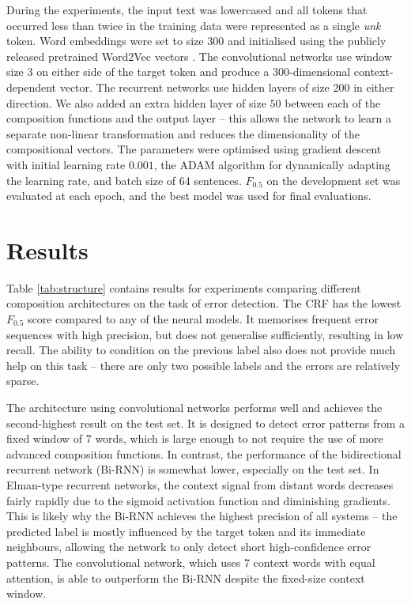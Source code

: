 \documentclass[11pt]{article}
\begin{document}
During the experiments, the input text was lowercased and all tokens that occurred less than twice in the training data were represented as a single \textit{unk} token.
Word embeddings were set to size $300$ and initialised using the publicly released pretrained Word2Vec vectors \cite{Mikolov2013a}.
The convolutional networks use window size $3$ on either side of the target token and produce a 300-dimensional context-dependent vector.
The recurrent networks use hidden layers of size 200 in either direction.
We also added an extra hidden layer of size $50$ between each of the composition functions and the output layer -- this allows the network to learn a separate non-linear transformation and reduces the dimensionality of the compositional vectors.
The parameters were optimised using gradient descent with initial learning rate $0.001$, the {\small ADAM} algorithm \cite{Kingma2015} for dynamically adapting the learning rate, and batch size of 64 sentences.
$F_{0.5}$ on the development set was evaluated at each epoch, and the best model was used for final evaluations.



\section{Results}

Table \ref{tab:structure} contains results for experiments comparing different composition architectures on the task of error detection.
The CRF has the lowest $F_{0.5}$ score compared to any of the neural models. It memorises frequent error sequences with high precision, but does not generalise sufficiently, resulting in low recall.
The ability to condition on the previous label also does not provide much help on this task -- there are only two possible labels and the errors are relatively sparse.

The architecture using convolutional networks performs well and achieves the second-highest result on the test set. It is designed to detect error patterns from a fixed window of 7 words, which is large enough to not require the use of more advanced composition functions.
In contrast, the performance of the bidirectional recurrent network (Bi-RNN) is somewhat lower, especially on the test set.
In Elman-type recurrent networks, the context signal from distant words decreases fairly rapidly due to the sigmoid activation function and diminishing gradients. 
This is likely why the Bi-RNN achieves the highest precision of all systems -- the predicted label is mostly influenced by the target token and its immediate neighbours, allowing the network to only detect short high-confidence error patterns.
The convolutional network, which uses 7 context words with equal attention, is able to outperform the Bi-RNN despite the fixed-size context window.
\end{document}
